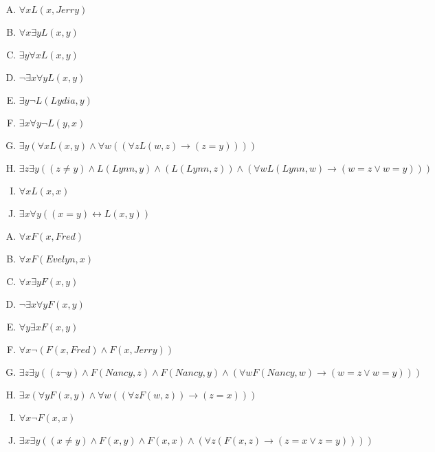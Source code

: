 {{        %
        \begin{practices}
            \begin{enumerate}[A.]
                \item $\forall x L(x, Jerry)$
                \item $\forall x \exists y L(x, y)$
                \item $\exists y \forall x L(x, y)$
                \item $\neg \exists x \forall y L(x, y)$
                \item $\exists y \neg L(Lydia, y)$
                \item $\exists x \forall y \neg L(y, x)$
                \item $\exists y (\forall x L(x, y) \wedge \forall w ((\forall z L(w, z) \rightarrow (z = y))))$
                \item $\exists z \exists y ((z \neq y) \wedge L(Lynn, y) \wedge (L(Lynn, z)) \wedge (\forall w L(Lynn, w) \rightarrow (w = z \vee w = y)))$
                \item $\forall x L(x, x)$
                \item $\exists x \forall y ((x = y) \leftrightarrow L(x, y))$
            \end{enumerate}
        \end{practices}

        \begin{practices}
            \begin{enumerate}[A.]
                \item $\forall x F(x, Fred)$
                \item $\forall x F(Evelyn, x)$
                \item $\forall x \exists y F(x, y)$
                \item $\neg \exists x \forall y F(x, y)$
                \item $\forall y \exists x F(x, y)$
                \item $\forall x \neg (F(x, Fred) \wedge F(x, Jerry))$
                \item $\exists z \exists y ((z \neg y) \wedge F(Nancy, z) \wedge F(Nancy, y) \wedge (\forall w F(Nancy, w) \rightarrow (w = z \vee w = y)))$
                \item $\exists x (\forall y F(x, y) \wedge \forall w ((\forall z F(w, z)) \rightarrow (z = x)))$
                \item $\forall x \neg F(x, x)$
                \item $\exists x \exists y ((x \neq y) \wedge F(x, y) \wedge F(x, x) \wedge (\forall z (F(x, z) \rightarrow (z = x \vee z = y))))$
            \end{enumerate}
        \end{practices}

}}
